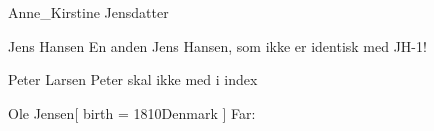 \documentclass[
	twocolumn
]{article}
\begin{document}
\begin{gprProfile}{Anne_Kirstine Jensdatter}
	\gprGivenName{}

\end{gprProfile}

\begin{gprProfile}{Jens Hansen}
	En anden Jens Hansen, som ikke er identisk med JH-1!
\end{gprProfile}

\begin{gprProfile}[no index]{Peter Larsen}
	Peter skal ikke med i index
\end{gprProfile}



\begin{gprProfile}{Ole Jensen}[
	birth = {1810}{Denmark}
]
	Far:
\end{gprProfile}

\printindex[gpr-id]
\end{document}
